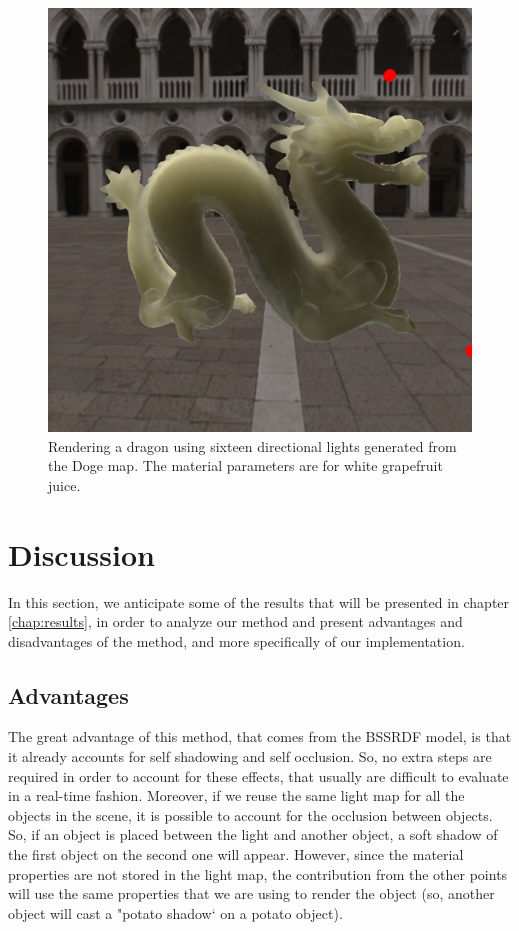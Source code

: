 \begin{figure}
\centering

\includegraphics[width=0.9 \linewidth]{images/results/skymap_1.png}
\caption{Rendering a dragon using sixteen directional lights generated from the Doge map. The material parameters are for white grapefruit juice.}
\label{fig:doge_render_grape}
\end{figure}

\section{Discussion}
In this section, we anticipate some of the results that will be presented in chapter \ref{chap:results}, in order to analyze our method and present advantages and disadvantages of the method, and more specifically of our implementation.

\subsection{Advantages}

The great advantage of this method, that comes from the BSSRDF model, is that it already accounts for self shadowing and self occlusion. So, no extra steps are required in order to account for these effects, that usually are difficult to evaluate in a real-time fashion. Moreover, if we reuse the same light map for all the objects in the scene, it is possible to account for the occlusion between objects. So, if an object is placed between the light and another object, a soft shadow of the first object on the second one will appear. However, since the material properties are not stored in the light map, the contribution from the other points will use the same properties that we are using to render the object (so, another object will cast a "potato shadow` on a potato object).  

